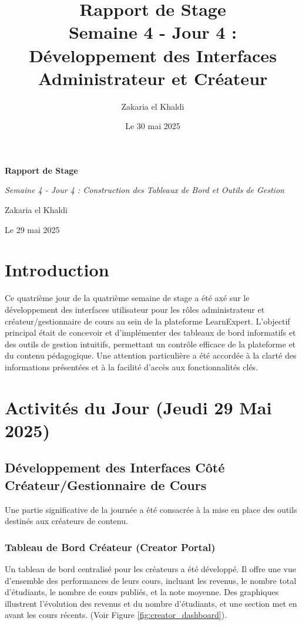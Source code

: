 \documentclass[12pt, a4paper]{article}
\title{\Huge\bfseries\color{primary} Rapport de Stage \\ 
      \Large Semaine 4 - Jour 4 : Développement des Interfaces Administrateur et Créateur} %
\author{\Large Zakaria el Khaldi}
\date{\large Le 30 mai 2025} %
\begin{document}
\begin{titlepage}
  \centering
  {\Huge\bfseries\color{primary} Rapport de Stage \par}
  \vspace{1cm}
  {\Large\itshape Semaine 4 - Jour 4 : Construction des Tableaux de Bord et Outils de Gestion\par} %
  \vspace{2cm}
  
  \vspace{2cm}
  {\Large Zakaria el Khaldi\par}
  \vfill
  {\large Le 29 mai 2025\par} %
\end{titlepage}

\tableofcontents
\thispagestyle{empty}
\newpage

\section{Introduction}
\thispagestyle{fancy}
Ce quatrième jour de la quatrième semaine de stage a été axé sur le développement des interfaces utilisateur pour les rôles administrateur et créateur/gestionnaire de cours au sein de la plateforme LearnExpert. L'objectif principal était de concevoir et d'implémenter des tableaux de bord informatifs et des outils de gestion intuitifs, permettant un contrôle efficace de la plateforme et du contenu pédagogique. Une attention particulière a été accordée à la clarté des informations présentées et à la facilité d'accès aux fonctionnalités clés.

\section{Activités du Jour (Jeudi 29 Mai 2025)} %

\subsection{Développement des Interfaces Côté Créateur/Gestionnaire de Cours}
Une partie significative de la journée a été consacrée à la mise en place des outils destinés aux créateurs de contenu.

\subsubsection{Tableau de Bord Créateur (Creator Portal)}
Un tableau de bord centralisé pour les créateurs a été développé. Il offre une vue d'ensemble des performances de leurs cours, incluant les revenus, le nombre total d'étudiants, le nombre de cours publiés, et la note moyenne. Des graphiques illustrent l'évolution des revenus et du nombre d'étudiants, et une section met en avant les cours récents. (Voir Figure \ref{fig:creator_dashboard}).
\end{document}
